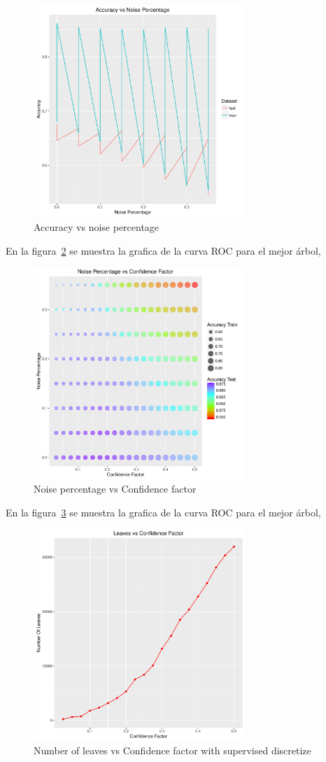 \begin{figure}
  \centering
  \includegraphics[width = 8cm]{5c.pdf}
  \caption{Accuracy vs noise percentage}
  \label{fig:5c}
\end{figure}

En la figura~\ref{fig:5d} se muestra la grafica de la curva ROC para el mejor árbol,

\begin{figure}
  \centering
  \includegraphics[width = 8cm]{5d.pdf}
  \caption{Noise percentage vs Confidence factor}
  \label{fig:5d}
\end{figure}

En la figura~\ref{fig:6a} se muestra la grafica de la curva ROC para el mejor árbol,

\begin{figure}
  \centering
  \includegraphics[width = 8cm]{6a.pdf}
  \caption{Number of leaves vs Confidence factor with supervised discretize}
  \label{fig:6a}
\end{figure}

